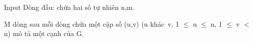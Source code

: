 Input
Dòng đầu: chứa hai số tự nhiên n,m.

M dòng sau mỗi dòng chứa một cặp số (u,v) (u khác v, 1  $\le$  u  $\le$  n, 1  $\le$  v $<$ n) mô tả một cạnh của G.